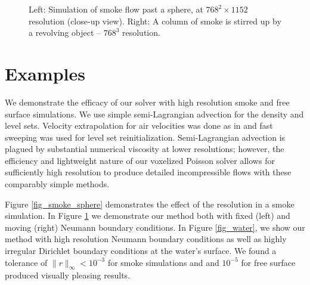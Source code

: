 \begin{figure}[ht]
 \caption[High resolution smoke simulations]{Left: Simulation of smoke
   flow past a sphere, at $768^2\!\times\!1152$ resolution (close-up
   view). Right: A column of smoke is stirred up by a revolving object
   -- $768^3$ resolution.}
\label{fig_smoke}
\end{figure}


\section{Examples}
We demonstrate the efficacy of our solver with high resolution smoke and free surface simulations. We use simple semi-Lagrangian advection \cite{Stam:1999:SF} for the density and level
sets. Velocity extrapolation for air velocities was done as in \cite{zhu:2005:sand} and fast sweeping \cite{Z04} was used for level set reinitialization. Semi-Lagrangian advection 
is plagued by substantial numerical viscosity at lower resolutions; however, the efficiency and lightweight nature of our voxelized Poisson solver allows for sufficiently high resolution
to produce detailed incompressible flows with these comparably simple
methods. 

Figure \ref{fig_smoke_sphere} demonstrates the effect of the resolution in a
smoke simulation.  In Figure \ref{fig_smoke} we demonstrate our method
both with fixed (left) and moving (right) Neumann boundary conditions.
In Figure \ref{fig_water}, we show our method with high resolution
Neumann boundary conditions as well as highly irregular Dirichlet
boundary conditions at the water's surface.  We found a tolerance of
$\|r\|_{\infty}<10^{-3}$ for smoke simulations and and $10^{-5}$ for
free surface produced visually pleasing results. 



